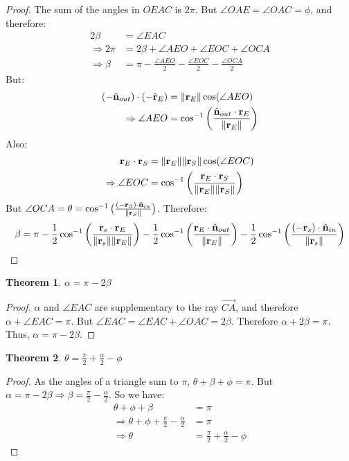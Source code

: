 \documentclass{article}
\theoremstyle{mystyle}
\newtheorem{theorem}{Theorem}[section]
\DeclarePairedDelimiter\norm{\lVert}{\rVert}
\begin{document}
\begin{proof}
The sum of the angles in $OEAC$ is $2\pi$. But $\angle OAE = \angle OAC = \phi$, and therefore:
\begin{align*}
    2\beta &=\angle EAC \\
    \Rightarrow 2\pi &= 2\beta + \angle AEO + \angle EOC + \angle OCA\\
    \Rightarrow \beta &= \pi - \frac{\angle AEO}{2}-\frac{\angle EOC}{2}-\frac{\angle OCA}{2}
\end{align*}
But:
\begin{align*}
(-\hat{\mathbf{n}}_{out})\cdot (-\hat{\mathbf{r}}_{E}) &= \norm{\mathbf{r}_{E}}\cos(\angle AEO)\\
\Rightarrow \angle AEO &= \cos^{-1}\bigg(\frac{\hat{\mathbf{n}}_{out}\cdot \mathbf{r}_{E}}{\norm{\mathbf{r}_{E}}}\bigg)
\end{align*}
Also:
\begin{align*}
    \mathbf{r}_{E}\cdot \mathbf{r}_{S} &= \norm{\mathbf{r}_{E}}\norm{\mathbf{r}_{S}}\cos(\angle EOC)\\
    \Rightarrow \angle EOC &= \cos^{-1}\bigg(\frac{\mathbf{r}_{E}\cdot \mathbf{r}_{S}}{\norm{\mathbf{r}_{E}}\norm{\mathbf{r}_{S}}}\bigg)
\end{align*}
But $\angle OCA = \theta = \cos^{-1}\big(\frac{(-\mathbf{r}_{S})\cdot \hat{\mathbf{n}}_{in}}{\norm{\mathbf{r}_{S}}}\big)$. Therefore:
\begin{equation*}
\beta = \pi - \frac{1}{2}\cos^{-1}\bigg(\frac{\mathbf{r}_{s}\cdot \mathbf{r}_{E}}{\norm{\mathbf{r}_{s}}\norm{\mathbf{r}_{E}}}\bigg) - \frac{1}{2}\cos^{-1}\bigg(\frac{\mathbf{r}_{E}\cdot \hat{\mathbf{n}}_{out}}{\norm{\mathbf{r}_{E}}}\bigg) - \frac{1}{2}\cos^{-1}\bigg(\frac{(-\mathbf{r}_{s})\cdot \hat{\mathbf{n}}_{in}}{\norm{\mathbf{r}_{s}}}\bigg)
\end{equation*}
\end{proof}
\begin{theorem}
$\alpha = \pi - 2\beta$
\end{theorem}
\begin{proof}
$\alpha$ and $\angle EAC$ are supplementary to the ray $\overrightarrow{CA}$, and therefore $\alpha + \angle EAC = \pi$. But $\angle EAC = \angle EAC + \angle OAC = 2\beta$. Therefore $\alpha + 2\beta = \pi$. Thus, $\alpha = \pi - 2\beta$.
\end{proof}
\begin{theorem}
$\theta = \frac{\pi}{2}+ \frac{\alpha}{2}-\phi$
\end{theorem}
\begin{proof}
As the angles of a triangle sum to $\pi$, $\theta+\beta+\phi = \pi$. But $\alpha = \pi - 2\beta \Rightarrow \beta = \frac{\pi}{2}-\frac{\alpha}{2}$. So we have:
\begin{align*}
    \theta+\phi+\beta &=\pi \\
    \Rightarrow \theta+\phi+\frac{\pi}{2}-\frac{\alpha}{2} &= \pi\\
    \Rightarrow \theta &= \frac{\pi}{2} +\frac{\alpha}{2}-\phi
\end{align*}
\end{proof}
\end{document}
